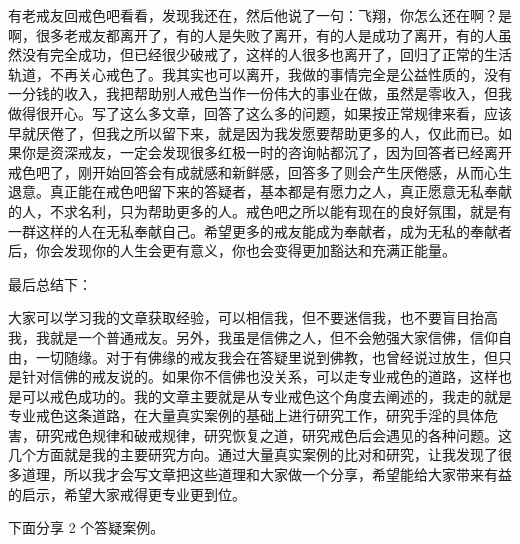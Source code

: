 \documentclass[fontset=founder]{ctexart}
\begin{document}
有老戒友回戒色吧看看，发现我还在，然后他说了一句：飞翔，你怎么还在啊？是啊，很多老戒友都离开了，有的人是失败了离开，有的人是成功了离开，有的人虽然没有完全成功，但已经很少破戒了，这样的人很多也离开了，回归了正常的生活轨道，不再关心戒色了。我其实也可以离开，我做的事情完全是公益性质的，没有一分钱的收入，我把帮助别人戒色当作一份伟大的事业在做，虽然是零收入，但我做得很开心。写了这么多文章，回答了这么多的问题，如果按正常规律来看，应该早就厌倦了，但我之所以留下来，就是因为我发愿要帮助更多的人，仅此而已。如果你是资深戒友，一定会发现很多红极一时的咨询帖都沉了，因为回答者已经离开戒色吧了，刚开始回答会有成就感和新鲜感，回答多了则会产生厌倦感，从而心生退意。真正能在戒色吧留下来的答疑者，基本都是有愿力之人，真正愿意无私奉献的人，不求名利，只为帮助更多的人。戒色吧之所以能有现在的良好氛围，就是有一群这样的人在无私奉献自己。希望更多的戒友能成为奉献者，成为无私的奉献者后，你会发现你的人生会更有意义，你也会变得更加豁达和充满正能量。

最后总结下：

大家可以学习我的文章获取经验，可以相信我，但不要迷信我，也不要盲目抬高我，我就是一个普通戒友。另外，我虽是信佛之人，但不会勉强大家信佛，信仰自由，一切随缘。对于有佛缘的戒友我会在答疑里说到佛教，也曾经说过放生，但只是针对信佛的戒友说的。如果你不信佛也没关系，可以走专业戒色的道路，这样也是可以戒色成功的。我的文章主要就是从专业戒色这个角度去阐述的，我走的就是专业戒色这条道路，在大量真实案例的基础上进行研究工作，研究手淫的具体危害，研究戒色规律和破戒规律，研究恢复之道，研究戒色后会遇见的各种问题。这几个方面就是我的主要研究方向。通过大量真实案例的比对和研究，让我发现了很多道理，所以我才会写文章把这些道理和大家做一个分享，希望能给大家带来有益的启示，希望大家戒得更专业更到位。

下面分享 2 个答疑案例。
\end{document}
